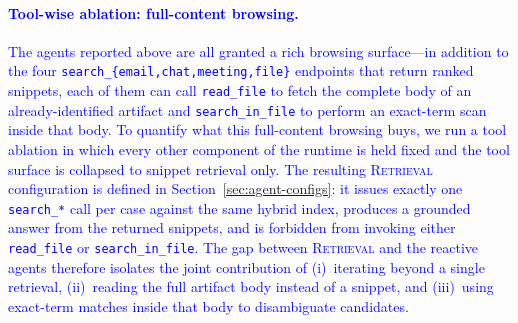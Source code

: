 \paragraph{\textcolor{blue}{Tool-wise ablation: full-content browsing.}}
\label{sec:ablation-tool}
\textcolor{blue}{The agents reported above are all granted a rich browsing surface---in addition to the four \texttt{search\_\{email,chat,meeting,file\}} endpoints that return ranked snippets, each of them can call \texttt{read\_file} to fetch the complete body of an already-identified artifact and \texttt{search\_in\_file} to perform an exact-term scan inside that body. To quantify what this full-content browsing buys, we run a tool ablation in which every other component of the runtime is held fixed and the tool surface is collapsed to snippet retrieval only. The resulting \textsc{Retrieval} configuration is defined in Section~\ref{sec:agent-configs}: it issues exactly one \texttt{search\_*} call per case against the same hybrid index, produces a grounded answer from the returned snippets, and is forbidden from invoking either \texttt{read\_file} or \texttt{search\_in\_file}. The gap between \textsc{Retrieval} and the reactive agents therefore isolates the joint contribution of (i)~iterating beyond a single retrieval, (ii)~reading the full artifact body instead of a snippet, and (iii)~using exact-term matches inside that body to disambiguate candidates.}

